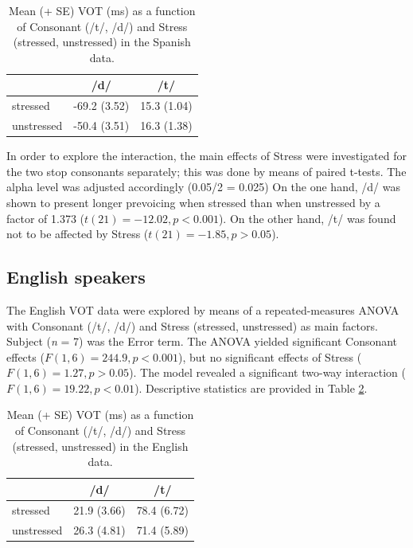 \documentclass[a4paper]{article}
\begin{document}
\begin{table}
	\centering
	\begin{tabular}{|l|c|c|}
	\hline
	& /d/ & /t/ \\
	\hline \hline
	stressed & -69.2 (3.52) & 15.3 (1.04) \\
	unstressed & -50.4 (3.51) & 16.3 (1.38) \\
	\hline
	\end{tabular}
		\caption{Mean (+ SE) VOT (ms) as a function of Consonant (/t/, /d/) and Stress (stressed, unstressed) in the Spanish data.} \label{tab:span}
\end{table}

In order to explore the interaction, the main effects of Stress were investigated for the two stop consonants separately; this was done by means of paired t-tests. The alpha level was adjusted accordingly (0.05/2 = 0.025) On the one hand, /d/ was shown to present longer prevoicing when stressed than when unstressed by a factor of 1.373 ($t(21) = -12.02, p < 0.001$). On the other hand, /t/ was found not to be affected by Stress ($t(21) = -1.85, p > 0.05$).

\subsection{English speakers}

The English VOT data were explored by means of a repeated-measures ANOVA with Consonant (/t/, /d/) and Stress (stressed, unstressed) as main factors. Subject (\emph{n} = 7) was the Error term. The ANOVA yielded significant Consonant effects ($F(1,6) = 244.9, p < 0.001$), but no significant effects of Stress ($F(1,6) = 1.27, p > 0.05$). The model revealed a significant two-way interaction ($F(1,6) = 19.22, p < 0.01$). Descriptive statistics are provided in Table \ref{tab:eng}.

\begin{table}
	\centering
	\begin{tabular}{|l|c|c|}
	\hline
	& /d/ & /t/ \\
	\hline \hline
	stressed & 21.9 (3.66) & 78.4 (6.72) \\
	unstressed & 26.3 (4.81) & 71.4 (5.89) \\
	\hline
	\end{tabular}
		\caption{Mean (+ SE) VOT (ms) as a function of Consonant (/t/, /d/) and Stress (stressed, unstressed) in the English data.} \label{tab:eng}
\end{table}
\end{document}
